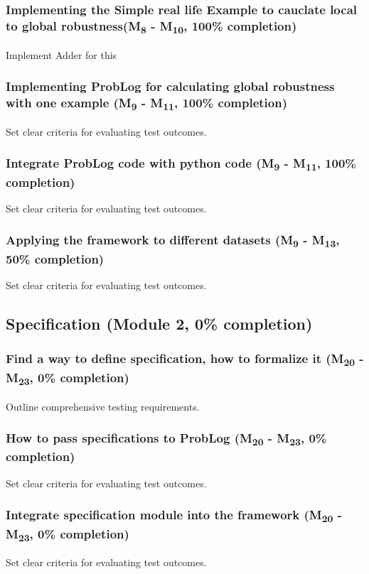 \subsubsection{Implementing the Simple real life Example to cauclate local to global robustness(M\textsubscript{8} - M\textsubscript{10}, 100\% completion)}
Implement Adder for this

\subsubsection{Implementing ProbLog for  calculating global robustness with one example (M\textsubscript{9} - M\textsubscript{11}, 100\% completion)}
Set clear criteria for evaluating test outcomes.

\subsubsection{Integrate ProbLog code with python code (M\textsubscript{9} - M\textsubscript{11}, 100\% completion)}
Set clear criteria for evaluating test outcomes.

\subsubsection{Applying the framework to different datasets (M\textsubscript{9} - M\textsubscript{13}, 50\% completion)}
Set clear criteria for evaluating test outcomes.



\subsection{Specification (Module 2, 0\% completion)}
\subsubsection{Find a way to define specification, how to  formalize it (M\textsubscript{20} - M\textsubscript{23}, 0\% completion)}
Outline comprehensive testing requirements.

\subsubsection{How to pass specifications to ProbLog (M\textsubscript{20} - M\textsubscript{23}, 0\% completion)}
Set clear criteria for evaluating test outcomes.

\subsubsection{Integrate specification module into the framework (M\textsubscript{20} - M\textsubscript{23}, 0\% completion)}
Set clear criteria for evaluating test outcomes.



